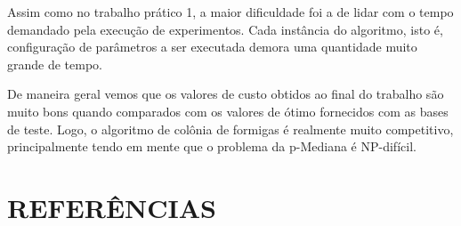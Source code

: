 \documentclass[12pt]{article}
\begin{document}
Assim como no trabalho prático 1, a maior dificuldade foi a de lidar com o tempo demandado pela
execução de experimentos. Cada instância do algoritmo, isto é, configuração de parâmetros a ser
executada demora uma quantidade muito grande de tempo.

De maneira geral vemos que os valores de custo obtidos ao final do trabalho são muito bons quando
comparados com os valores de ótimo fornecidos com as bases de teste. Logo, o algoritmo de colônia 
de formigas é realmente muito competitivo, principalmente tendo em mente que o problema da 
p-Mediana é NP-difícil.

\section{REFERÊNCIAS}



\end{document}
